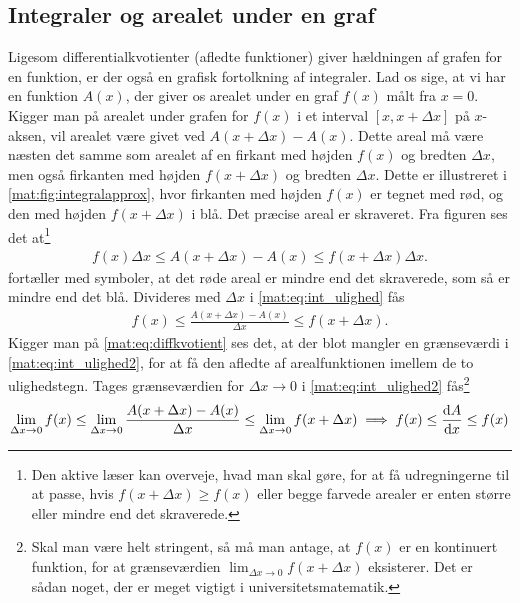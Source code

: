 \subsection{Integraler og arealet under en graf} \label{mat:subsec:int}
Ligesom differentialkvotienter (afledte funktioner) giver hældningen af grafen for en funktion, er der også en grafisk fortolkning af integraler.
Lad os sige, at vi har en funktion $A(x)$, der giver os arealet under en graf $f(x)$ målt fra $x=0$. Kigger man på arealet under grafen for $f(x)$ i et interval $[x,x+\Delta x]$ på $x$-aksen, vil arealet være givet ved $A(x+\Delta x) - A(x)$. Dette areal må være næsten det samme som arealet af en firkant med højden $f(x)$ og bredten $\Delta x$, men også firkanten med højden $f(x+\Delta x)$ og bredten $\Delta x$. Dette er illustreret i \cref{mat:fig:integralapprox}, hvor firkanten med højden $f(x)$ er tegnet med rød, og den med højden $f(x+\Delta x)$ i blå. Det præcise areal er skraveret. Fra figuren ses det at\footnote{Den aktive læser kan overveje, hvad man skal gøre, for at få udregningerne til at passe, hvis $f(x + \Delta x) \geq f(x)$ eller begge farvede arealer er enten større eller mindre end det skraverede.}
%
\begin{align} \label{mat:eq:int_ulighed}
    f(x)\Delta x \leq A(x+\Delta x) - A(x) \leq f(x+\Delta x) \Delta x.
\end{align}
%
 fortæller med symboler, at det røde areal er mindre end det skraverede, som så er mindre end det blå. Divideres med $\Delta x$ i \cref{mat:eq:int_ulighed} fås
%
\begin{align} \label{mat:eq:int_ulighed2}
    f(x) \leq \frac{A(x+\Delta x) - A(x)}{\Delta x} \leq f(x+\Delta x).
\end{align}
%
Kigger man på \cref{mat:eq:diffkvotient} ses det, at der blot mangler en grænseværdi i \cref{mat:eq:int_ulighed2}, for at få den afledte af arealfunktionen imellem de to ulighedstegn. Tages grænseværdien for $\Delta x \rightarrow 0$ i \cref{mat:eq:int_ulighed2} fås\footnote{Skal man være helt stringent, så må man antage, at $f(x)$ er en kontinuert funktion, for at grænseværdien $\lim_{\Delta x\rightarrow 0} f(x+\Delta x)$ eksisterer. Det er sådan noget, der er meget vigtigt i universitetsmatematik.}
%
\begin{align} \label{mat:eq:int_ulighed3}
    \lim_{\Delta x\rightarrow 0} f(x) \leq \lim_{\Delta x\rightarrow 0} \frac{A(x+\Delta x) - A(x)}{\Delta x} \leq \lim_{\Delta x\rightarrow 0} f(x+\Delta x) \implies f(x) \leq \dv{A}{x} \leq f(x)
\end{align}
